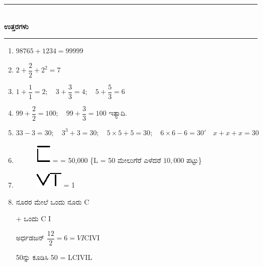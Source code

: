 \smallskip

\begin{center}
\rule{5cm}{1pt}\\[3pt]
{\Large\bfseries ಉತ್ತರಗಳು}\\[-0.1cm]
\rule{5cm}{1pt}
\end{center}

\begin{enumerate}
\item $98765 + 1234 = 99999$

\item $2 + \dfrac{2}{2} + 2^{2} = 7$

\item $1 + \dfrac{1}{1} = 2; \quad 3 + \dfrac{3}{3} = 4;\quad 5 + \dfrac{5}{3} = 6$

\item $99 + \dfrac{2}{2} = 100;\quad 99 + \dfrac{3}{3} = 100$ ಇತ್ಯಾದಿ. 

\item $33 - 3 = 30;\quad 3^{3} + 3 = 30;\quad 5 \times 5 + 5 = 30;\quad 6 \times 6 - 6 = 30'\quad x + x + x = 30$

\item 
\begin{figure}[H]
\centering
\includegraphics{images/chap6/ans6.eps}
= = 50,000 \{L = 50 ಮೇಲುಗೆರೆ ಎಳೆದರೆ $10,000$ ಪಟ್ಟು\}
\end{figure}

\item
\begin{figure}[H]
\centering
\includegraphics{images/chap6/ans7.eps}
= 1
\end{figure}

\item ನೂರರ ಮೇಲೆ ಒಂದು ನೂರು C

$+$ ಒಂದು C I

ಅರ್ಧಡಜನ್ $\dfrac{12}{2} = 6 = VI$\qquad CIVI

50ನ್ನು ಕೂಡಿಸಿ 50 = L\qquad CIVIL


\end{enumerate}
